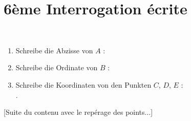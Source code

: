 \documentclass[10pt,openany]{book}
\begin{document}
\pagestyle{empty}
\section*{6\`eme Interrogation \'ecrite}

\\
\begin{enumerate}
\item Schreibe die Abzisse von $A$ : \dotfill
\item Schreibe die Ordinate von $B$ : \dotfill
\item Schreibe die Koordinaten von den Punkten $C$, $D$, $E$ :\\
.\dotfill
\end{enumerate}

[Suite du contenu avec le repérage des points...]
\end{document}
